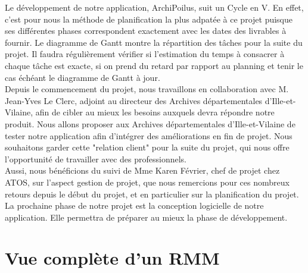 \documentclass[a4paper]{article}
\begin{document}
	Le développement de notre application, ArchiPoilus, suit un Cycle en V. En effet, c'est pour nous la méthode de planification la plus adpatée à ce projet puisque ses différentes phases correspondent exactement avec les dates des livrables à fournir. Le diagramme de Gantt montre la répartition des tâches pour la suite du projet. Il faudra régulièrement vérifier si l'estimation du temps à consacrer à chaque tâche est exacte, si on prend du retard par rapport au planning et tenir le cas échéant le diagramme de Gantt à jour.\\
	
	Depuis le commencement du projet, nous travaillons en collaboration avec M. Jean-Yves Le Clerc, adjoint au directeur des Archives départementales d’Ille-et-Vilaine, afin de cibler au mieux les besoins auxquels devra répondre notre produit. Nous allons proposer aux Archives départementales d’Ille-et-Vilaine de tester notre application afin d'intégrer des améliorations en fin de projet. Nous souhaitons garder cette "relation client"  pour la suite du projet, qui nous offre l’opportunité de travailler avec des professionnels.\\
	
	Aussi, nous bénéficions du suivi de Mme Karen Février, chef de projet chez ATOS, sur l’aspect gestion de projet, que nous remercions pour ces nombreux retours depuis le début du projet, et en particulier sur la planification du projet.\\
	
	La prochaine phase de notre projet est la conception logicielle de notre application. Elle permettra de préparer au mieux la phase de développement.

\appendix

\section{Vue compl\`ete d'un RMM}
\label{sec:annexe 1}
\end{document}
